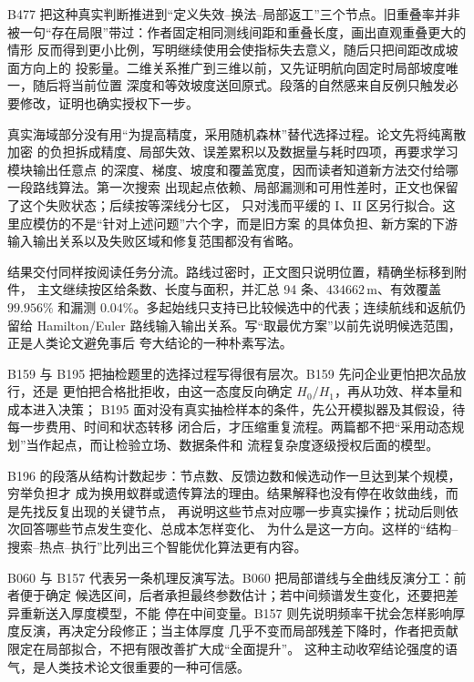 B477 把这种真实判断推进到“定义失效--换法--局部返工”三个节点。旧重叠率并非
被一句“存在局限”带过：作者固定相同测线间距和重叠长度，画出直观重叠更大的情形
反而得到更小比例，写明继续使用会使指标失去意义，随后只把间距改成坡面方向上的
投影量。二维关系推广到三维以前，又先证明航向固定时局部坡度唯一，随后将当前位置
深度和等效坡度送回原式。段落的自然感来自反例只触发必要修改，证明也确实授权下一步。

真实海域部分没有用“为提高精度，采用随机森林”替代选择过程。论文先将纯离散加密
的负担拆成精度、局部失效、误差累积以及数据量与耗时四项，再要求学习模块输出任意点
的深度、梯度、坡度和覆盖宽度，因而读者知道新方法交付给哪一段路线算法。第一次搜索
出现起点依赖、局部漏测和可用性差时，正文也保留了这个失败状态；后续按等深线分七区，
只对浅而平缓的 I、II 区另行拟合。这里应模仿的不是“针对上述问题”六个字，而是旧方案
的具体负担、新方案的下游输入输出关系以及失败区域和修复范围都没有省略。

结果交付同样按阅读任务分流。路线过密时，正文图只说明位置，精确坐标移到附件，
主文继续按区给条数、长度与面积，并汇总 94 条、$434662\,\mathrm{m}$、有效覆盖
$99.956\%$ 和漏测 $0.04\%$。多起始线只支持已比较候选中的代表；连续航线和返航仍留给
Hamilton/Euler 路线输入输出关系。写“取最优方案”以前先说明候选范围，正是人类论文避免事后
夸大结论的一种朴素写法。

B159 与 B195 把抽检题里的选择过程写得很有层次。B159 先问企业更怕把次品放行，还是
更怕把合格批拒收，由这一态度反向确定 $H_0/H_1$，再从功效、样本量和成本进入决策；
B195 面对没有真实抽检样本的条件，先公开模拟器及其假设，待每一步费用、时间和状态转移
闭合后，才压缩重复流程。两篇都不把“采用动态规划”当作起点，而让检验立场、数据条件和
流程复杂度逐级授权后面的模型。

B196 的段落从结构计数起步：节点数、反馈边数和候选动作一旦达到某个规模，穷举负担才
成为换用蚁群或遗传算法的理由。结果解释也没有停在收敛曲线，而是先找反复出现的关键节点，
再说明这些节点对应哪一步真实操作；扰动后则依次回答哪些节点发生变化、总成本怎样变化、
为什么是这一方向。这样的“结构--搜索--热点--执行”比列出三个智能优化算法更有内容。

B060 与 B157 代表另一条机理反演写法。B060 把局部谱线与全曲线反演分工：前者便于确定
候选区间，后者承担最终参数估计；若中间频谱发生变化，还要把差异重新送入厚度模型，不能
停在中间变量。B157 则先说明频率干扰会怎样影响厚度反演，再决定分段修正；当主体厚度
几乎不变而局部残差下降时，作者把贡献限定在局部拟合，不把有限改善扩大成“全面提升”。
这种主动收窄结论强度的语气，是人类技术论文很重要的一种可信感。

